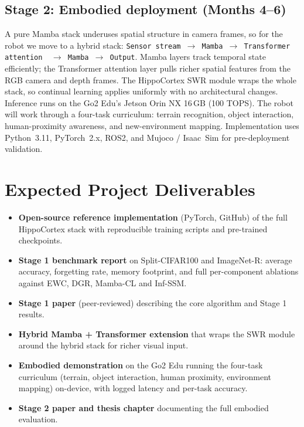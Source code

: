 \documentclass[11pt,a4paper]{article}
\newcommand{\objbold}[1]{\textbf{\color{neuroblue}#1}}
\begin{document}
\subsection{Stage 2: Embodied deployment (Months 4--6)}
A pure Mamba stack underuses spatial structure in camera frames, so for the robot we move to a hybrid stack: \texttt{Sensor stream $\to$ Mamba $\to$ Transformer attention~\citep{vaswani2017attention} $\to$ Mamba $\to$ Output}. Mamba layers track temporal state efficiently; the Transformer attention layer pulls richer spatial features from the RGB camera and depth frames. The HippoCortex SWR module wraps the whole stack, so continual learning applies uniformly with no architectural changes. Inference runs on the Go2 Edu's Jetson Orin NX 16\,GB (100 TOPS). The robot will work through a four-task curriculum: terrain recognition, object interaction, human-proximity awareness, and new-environment mapping. Implementation uses Python~3.11, PyTorch~2.x, ROS2, and Mujoco / Isaac~Sim for pre-deployment validation.

\section{Expected Project Deliverables}

\begin{itemize}[leftmargin=1.4em,itemsep=0.0em,topsep=0.05em]
  \item \objbold{Open-source reference implementation} (PyTorch, GitHub) of the full HippoCortex stack with reproducible training scripts and pre-trained checkpoints.
  \item \objbold{Stage 1 benchmark report} on Split-CIFAR100 and ImageNet-R: average accuracy, forgetting rate, memory footprint, and full per-component ablations against EWC, DGR, Mamba-CL and Inf-SSM.
  \item \objbold{Stage 1 paper} (peer-reviewed) describing the core algorithm and Stage 1 results.
  \item \objbold{Hybrid Mamba + Transformer extension} that wraps the SWR module around the hybrid stack for richer visual input.
  \item \objbold{Embodied demonstration} on the Go2 Edu running the four-task curriculum (terrain, object interaction, human proximity, environment mapping) on-device, with logged latency and per-task accuracy.
  \item \objbold{Stage 2 paper and thesis chapter} documenting the full embodied evaluation.
\end{itemize}
\end{document}

